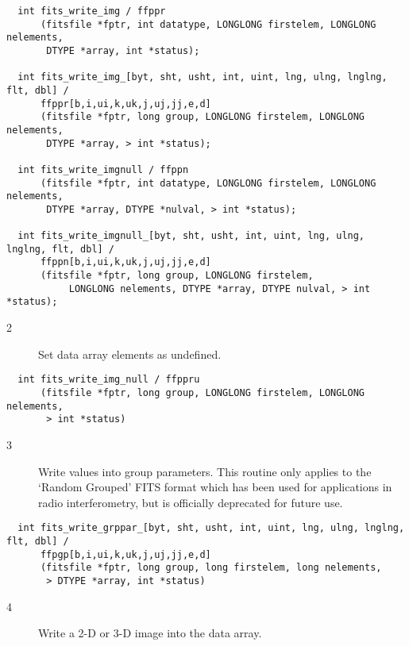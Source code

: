 \documentclass[11pt]{book}
\begin{document}
\begin{verbatim}
  int fits_write_img / ffppr
      (fitsfile *fptr, int datatype, LONGLONG firstelem, LONGLONG nelements,
       DTYPE *array, int *status);

  int fits_write_img_[byt, sht, usht, int, uint, lng, ulng, lnglng, flt, dbl] /
      ffppr[b,i,ui,k,uk,j,uj,jj,e,d]
      (fitsfile *fptr, long group, LONGLONG firstelem, LONGLONG nelements,
       DTYPE *array, > int *status);

  int fits_write_imgnull / ffppn
      (fitsfile *fptr, int datatype, LONGLONG firstelem, LONGLONG nelements,
       DTYPE *array, DTYPE *nulval, > int *status);

  int fits_write_imgnull_[byt, sht, usht, int, uint, lng, ulng, lnglng, flt, dbl] /
      ffppn[b,i,ui,k,uk,j,uj,jj,e,d]
      (fitsfile *fptr, long group, LONGLONG firstelem,
           LONGLONG nelements, DTYPE *array, DTYPE nulval, > int *status);
\end{verbatim}

\begin{description}
\item[2 ]Set data array elements as undefined. \label{ffppru}
\end{description}

\begin{verbatim}
  int fits_write_img_null / ffppru
      (fitsfile *fptr, long group, LONGLONG firstelem, LONGLONG nelements,
       > int *status)
\end{verbatim}

\begin{description}
\item[3 ] Write values into group parameters.  This routine only applies
    to the `Random Grouped' FITS format which has been used for
    applications in radio interferometry, but is officially deprecated
   for future use.  \label{ffpgpx}
\end{description}

\begin{verbatim}
  int fits_write_grppar_[byt, sht, usht, int, uint, lng, ulng, lnglng, flt, dbl] /
      ffpgp[b,i,ui,k,uk,j,uj,jj,e,d]
      (fitsfile *fptr, long group, long firstelem, long nelements,
       > DTYPE *array, int *status)
\end{verbatim}

\begin{description}
\item[4 ] Write a 2-D or 3-D image into the data array. \label{ffp2dx} \label{ffp3dx}
\end{description}
\end{document}
